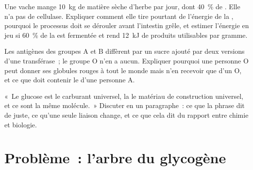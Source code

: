 \begin{exercise}[$\star\star\star$]\label{exo:b1:carbohydrates:10}
Une vache mange \qty{10}{kg} de matière sèche d'herbe par jour, dont
\qty{40}{\%} de . Elle n'a pas de cellulase. Expliquer comment
elle tire pourtant de l'énergie de la , pourquoi le processus
doit se dérouler avant l'intestin grêle, et estimer l'énergie en jeu si
\qty{60}{\%} de la  est fermentée et rend \qty{12}{kJ} de
produits utilisables par gramme.
\end{exercise}

\begin{exercise}[$\star\star\star$]\label{exo:b1:carbohydrates:11}
Les antigènes des groupes A et B diffèrent par un sucre ajouté par deux
versions d'une transférase~; le groupe O n'en a aucun. Expliquer
pourquoi une personne O peut donner ses globules rouges à tout le monde
mais n'en recevoir que d'un O, et ce que doit contenir le  d'une
personne A.
\end{exercise}

\begin{exercise}[$\star\star\star$]\label{exo:b1:carbohydrates:12}
«~Le glucose est le carburant universel, la  le matériau de
construction universel, et ce sont la même molécule.~» Discuter en un
paragraphe~: ce que la phrase dit de juste, ce qu'une seule liaison
change, et ce que cela dit du rapport entre chimie et biologie.
\end{exercise}

\section{Problème~: l'arbre du glycogène}

